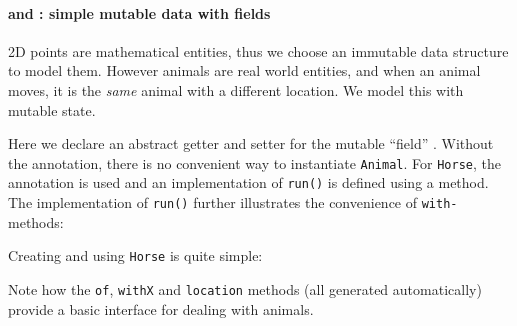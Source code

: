 %
%

\paragraph{\Q@Animal@ and \Q@Horse@: simple mutable data with fields}
2D points are mathematical entities, thus we choose an immutable data structure to
model them. However animals are real world entities, and when an animal moves,
it is the \emph{same} animal with a different location. We model this with
mutable state.


\noindent Here we declare an abstract getter and setter for the mutable ``field''
\Q@location@.  Without the \mixin annotation, there is no convenient way to
instantiate \texttt{Animal}.  For \texttt{Horse}, the \mixin annotation is used
and an implementation of \texttt{run()} is defined using a \Q@default@
method. The implementation of \texttt{run()} further illustrates the convenience of \texttt{with-} methods:


\noindent Creating and using \texttt{Horse} is quite simple:


\noindent Note how the \texttt{of}, \texttt{withX} and
\texttt{location} methods (all generated automatically) provide a
basic interface for dealing with animals.

